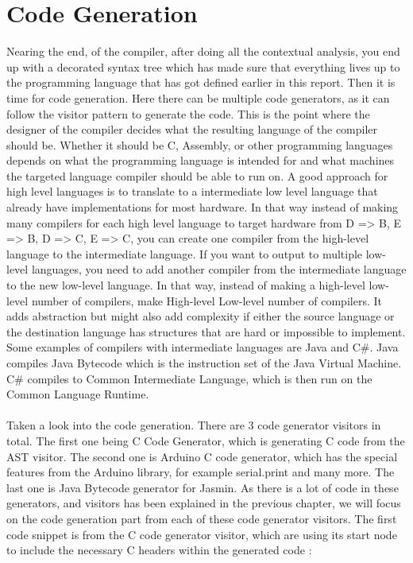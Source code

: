 \section{Code Generation}
Nearing the end, of the compiler, after doing all the contextual analysis, you end up with a decorated syntax tree which has made sure that everything lives up to the programming language that has got defined earlier in this report. Then it is time for code generation.
Here there can be multiple code generators, as it can follow the visitor pattern to generate the code. This is the point where the designer of the compiler decides what the resulting language of the compiler should be. Whether it should be C, Assembly, or other programming languages depends on what the programming language is intended for and what machines the targeted language compiler should be able to run on. 
A good approach for high level languages is to translate to a intermediate low level language that already have implementations for most hardware.  
In that way instead of making many compilers for each high level language to target hardware from D => B, E => B, D => C, E => C, you can create one compiler from the high-level language to the intermediate language. If you want to output to multiple low-level languages, you need to add another compiler from the intermediate language to the new low-level language. In that way, instead of making a high-level \* low-level number of compilers, make High-level \+ Low-level number of compilers. It adds abstraction but might also add complexity if either the source language or the destination language has structures that are hard or impossible to implement. Some examples of compilers with intermediate languages are Java and C\#. Java compiles Java Bytecode which is the instruction set of the Java Virtual Machine. C\# compiles to Common Intermediate Language, which is then run on the Common Language Runtime.\\
\\
Taken a look into the code generation. There are 3 code generator visitors in total. The first one being C Code Generator, which is generating C code from the AST visitor. The second one is Arduino C code generator, which has the special features from the Arduino library, for example serial.print and many more. The last one is Java Bytecode generator for Jasmin. As there is a lot of code in these generators, and visitors has been explained in the previous chapter, we will focus on the code generation part from each of these code generator visitors.
The first code snippet is from the C code generator visitor, which are using its start node to include the necessary C headers within the generated code : \\

\noindent\newline

